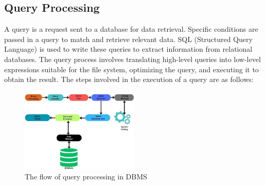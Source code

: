 \subsection{Query Processing }
A query is a request sent to a database for data retrieval. Specific conditions are passed in a query to match and retrieve relevant data. SQL (Structured Query Language) is used to write these queries to extract information from relational databases. The query process involves translating high-level queries into low-level expressions suitable for the file system, optimizing the query, and executing it to obtain the result. The steps involved in the execution of a query are as follows: \cite{wwwnaukricom-no-date}\\
\begin{figure}[h]
    \centering
    
    \includegraphics[width=0.5\textwidth]{Figure/Flow of QueryProcessing.jpg }
    \caption[The flow of query processing in DBMS]{The flow of query processing in DBMS ~\cite{wwwnaukricom-no-date} }
     
    \label{fig:my_image} 
\end{figure}
